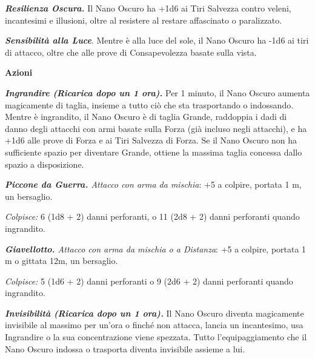 \begin{multicols}{2}
{\emph{\textbf{Resilienza Oscura.}} Il Nano Oscuro ha +1d6 ai Tiri Salvezza contro veleni, incantesimi e illusioni, oltre al resistere al restare affascinato o paralizzato.

\emph{\textbf{Sensibilità alla Luce}}. Mentre è alla luce del sole, il Nano Oscuro ha -1d6 ai tiri di attacco, oltre che alle prove di Consapevolezza basate sulla vista.

\textbf{Azioni}

\emph{\textbf{Ingrandire (Ricarica dopo un 1 ora).}} Per 1 minuto, il Nano Oscuro aumenta magicamente di taglia, insieme a tutto ciò che sta trasportando o indossando. Mentre è ingrandito, il Nano Oscuro è di taglia Grande, raddoppia i dadi di danno degli attacchi con armi basate sulla Forza (già incluso negli attacchi), e ha +1d6 alle prove di Forza e ai Tiri Salvezza di Forza. Se il Nano Oscuro non ha sufficiente spazio per diventare Grande, ottiene la massima taglia concessa dallo spazio a disposizione.

\emph{\textbf{Piccone da Guerra.} Attacco con arma da mischia}: +5 a colpire, portata 1 m, un bersaglio.

\emph{Colpisce:} 6 (1d8 + 2) danni perforanti, o 11 (2d8 + 2) danni perforanti quando ingrandito.

\emph{\textbf{Giavellotto.} Attacco con arma da mischia o a Distanza}: +5 a colpire, portata 1 m o gittata 12m, un bersaglio.

\emph{Colpisce:} 5 (1d6 + 2) danni perforanti o 9 (2d6 + 2) danni
perforanti quando ingrandito.

\emph{\textbf{Invisibilità (Ricarica dopo un 1 ora).}} Il Nano Oscuro diventa magicamente invisibile al massimo per un'ora o finché non attacca, lancia un incantesimo, usa Ingrandire o la sua concentrazione viene spezzata. Tutto l'equipaggiamento che il Nano Oscuro indossa o trasporta diventa invisibile assieme a lui.

}
\end{multicols}
